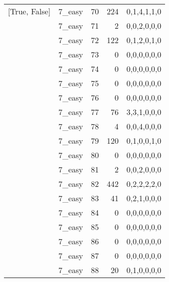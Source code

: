 \begin{tabular}{llrrl}
 [True, False]   & 7\_easy              &            70 &                   224 & 0,1,4,1,1,0   \\
 [True, False]   & 7\_easy              &            71 &                     2 & 0,0,2,0,0,0   \\
 [True, False]   & 7\_easy              &            72 &                   122 & 0,1,2,0,1,0   \\
 [True, False]   & 7\_easy              &            73 &                     0 & 0,0,0,0,0,0   \\
 [True, False]   & 7\_easy              &            74 &                     0 & 0,0,0,0,0,0   \\
 [True, False]   & 7\_easy              &            75 &                     0 & 0,0,0,0,0,0   \\
 [True, False]   & 7\_easy              &            76 &                     0 & 0,0,0,0,0,0   \\
 [True, False]   & 7\_easy              &            77 &                    76 & 3,3,1,0,0,0   \\
 [True, False]   & 7\_easy              &            78 &                     4 & 0,0,4,0,0,0   \\
 [True, False]   & 7\_easy              &            79 &                   120 & 0,1,0,0,1,0   \\
 [True, False]   & 7\_easy              &            80 &                     0 & 0,0,0,0,0,0   \\
 [True, False]   & 7\_easy              &            81 &                     2 & 0,0,2,0,0,0   \\
 [True, False]   & 7\_easy              &            82 &                   442 & 0,2,2,2,2,0   \\
 [True, False]   & 7\_easy              &            83 &                    41 & 0,2,1,0,0,0   \\
 [True, False]   & 7\_easy              &            84 &                     0 & 0,0,0,0,0,0   \\
 [True, False]   & 7\_easy              &            85 &                     0 & 0,0,0,0,0,0   \\
 [True, False]   & 7\_easy              &            86 &                     0 & 0,0,0,0,0,0   \\
 [True, False]   & 7\_easy              &            87 &                     0 & 0,0,0,0,0,0   \\
 [True, False]   & 7\_easy              &            88 &                    20 & 0,1,0,0,0,0   \\

\end{tabular}
